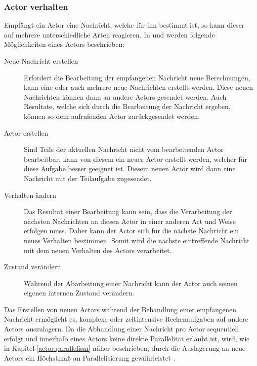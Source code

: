 \subsubsection{Actor verhalten}
\label{actorBehaviour}
Empfängt ein Actor eine Nachricht, welche für ihn bestimmt ist, so kann dieser auf mehrere unterschiedliche Arten reagieren. In \citep{Agha1985ActorsSystems} und \citep{Vernon2015ReactiveAkka} werden folgende Möglichkeiten eines Actors beschrieben:
\begin{description}
  \item[Neue Nachricht erstellen] Erfordert die Bearbeitung der empfangenen Nachricht neue Berechnungen, kann eine oder auch mehrere neue Nachrichten erstellt werden. Diese neuen Nachrichten können dann an andere Actors gesendet werden. Auch Resultate, welche sich durch die Bearbeitung der Nachricht ergeben, können so dem aufrufenden Actor zurückgesendet werden.
  \item[Actor erstellen] Sind Teile der aktuellen Nachricht nicht vom bearbeitenden Actor bearbeitbar, kann von diesem ein neuer Actor erstellt werden, welcher für diese Aufgabe besser geeignet ist. Diesem neuen Actor wird dann eine Nachricht mit der Teilaufgabe zugesendet.
  \item[Verhalten ändern] Das Resultat einer Bearbeitung kann sein, dass die Verarbeitung der nächsten Nachrichten an diesen Actor in einer anderen Art und Weise erfolgen muss. Daher kann der Actor sich für die nächste Nachricht ein neues Verhalten bestimmen. Somit wird die nächste eintreffende Nachricht mit dem neuen Verhalten des Actors verarbeitet.
  \item[Zustand verändern] Während der Abarbeitung einer Nachricht kann der Actor auch seinen eigenen internen Zustand verändern.
\end{description}
Das Erstellen von neuen Actors während der Behandlung einer empfangenen Nachricht ermöglicht es, komplexe oder zeitintensive Rechenaufgaben auf andere Actors auszulagern. Da die Abhandlung einer Nachricht pro Actor sequentiell erfolgt und innerhalb eines Actors keine direkte Parallelität erlaubt ist, wird, wie in Kapitel \ref{actor:parallelism} näher beschrieben, durch die Auslagerung an neue Actors ein Höchstmaß an Parallelisierung gewährleistet \citep{Agha1985ConcurrentParallelism}.

